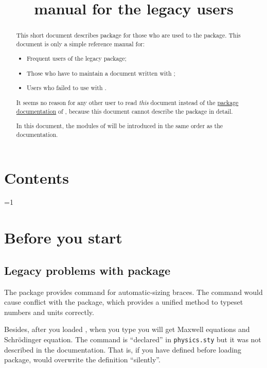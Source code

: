 \documentclass[11pt,letterpaper]{article}
\title{\pkg{physics2} manual for the legacy \pkg{physics} users}
\begin{document}
\maketitle

\begin{abstract}
This short document describes  package for those who are
used to the  package. This document is only a simple reference
manual for:
\begin{itemize}
\item Frequent users of the legacy  package;
\item Those who have to maintain a document written with ;
\item Users who failed to use  with .
\end{itemize}
It seems no reason for any other user to read \emph{this} document instead of
the \href{./physics2.pdf}{package documentation} of ,
because this document cannot describe the package in detail.

In this document, the modules of  will be introduced in
the same order as the  documentation.
\end{abstract}

\section*{Contents}
\begin{multicols}{2}
\contentsonly
\end{multicols}
\ifnum\value{page}=1 \vfil\clearpage\fi

\section{Before you start}
\subsection{Legacy problems with  package}
\label{subsec:physics-legacy-problems}
The  package provides  command for automatic-sizing
braces. The  command would cause conflict with the 
package, which provides a unified method to typeset numbers and units
correctly.

Besides, after you loaded , when you type  you
will get Maxwell equations and Schrödinger equation. The 
command is ``declared'' in \texttt{physics.sty} but it was not described
in the documentation. That is, if you have defined  before
loading  package,  would overwrite the definition
``silently''.
\end{document}
